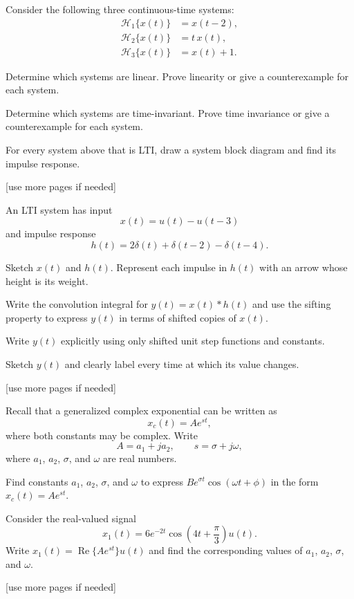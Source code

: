 \documentclass{ee102_pset}
\begin{document}
Consider the following three continuous-time systems:
\[
\begin{aligned}
\mathcal{H}_1\{x(t)\}&=x(t-2),\\
\mathcal{H}_2\{x(t)\}&=t\,x(t),\\
\mathcal{H}_3\{x(t)\}&=x(t)+1.
\end{aligned}
\]

\problempart{[5 points]} Determine which systems are linear. Prove linearity or
give a counterexample for each system.

\problempart{[5 points]} Determine which systems are time-invariant. Prove time
invariance or give a counterexample for each system.

\problempart{[5 points]} For every system above that is LTI, draw a system block
diagram and find its impulse response.

\vspace*{\fill}
\begin{center}
[use more pages if needed]
\end{center}

An LTI system has input
\[
x(t)=u(t)-u(t-3)
\]
and impulse response
\[
h(t)=2\delta(t)+\delta(t-2)-\delta(t-4).
\]

\problempart{[3 points]} Sketch $x(t)$ and $h(t)$. Represent each impulse in
$h(t)$ with an arrow whose height is its weight.

\problempart{[5 points]} Write the convolution integral for
$y(t)=x(t)*h(t)$ and use the sifting property to express $y(t)$ in terms of
shifted copies of $x(t)$.

\problempart{[4 points]} Write $y(t)$ explicitly using only shifted unit step
functions and constants.

\problempart{[3 points]} Sketch $y(t)$ and clearly label every time at which its
value changes.

\vspace*{\fill}
\begin{center}
[use more pages if needed]
\end{center}

Recall that a generalized complex exponential can be written as
\[
x_c(t)=A e^{st},
\]
where both constants may be complex. Write
\[
A=a_1+ja_2, \qquad s=\sigma+j\omega,
\]
where $a_1$, $a_2$, $\sigma$, and $\omega$ are real numbers.

\problempart{[5 points]} Find constants $a_1$, $a_2$, $\sigma$, and $\omega$ to express
\(
B e^{\sigma t}\cos(\omega t+\phi)
\)
in the form $x_c(t)=A e^{st}$.

\problempart{[10 points]} Consider the real-valued signal
\[
x_1(t)=6e^{-2t}\cos\left(4t+\frac{\pi}{3}\right)u(t).
\]
Write $x_1(t)=\operatorname{Re}\{A e^{st}\}u(t)$ and find the corresponding
values of $a_1$, $a_2$, $\sigma$, and $\omega$.

\vspace*{\fill}
\begin{center}
[use more pages if needed]
\end{center}
\end{document}
